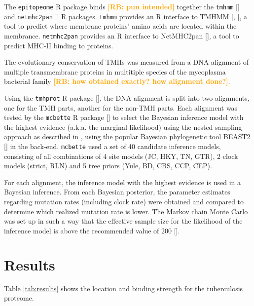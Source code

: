 \documentclass{article}
\newcommand{\richel}[1]{\textcolor{orange}{\textbf{[RB: #1]}}}
\begin{document}
The \verb;epitopeome; R package \cite{epitopeome} binds \richel{pun intended} 
together the \verb;tmhmm; [\cite{tmhmm}] and \verb;netmhc2pan; 
[\cite{netmhc2pan}] 
R packages. \verb;tmhmm; provides an R interface to
TMHMM [\cite{krogh2001predicting}, \cite{sonnhammer1998hidden}], a tool
to predict where membrane proteins' amino acids are located within the
membrance.   
\verb;netmhc2pan; provides an R interface to
NetMHC2pan [\cite{jensen2018improved}], a tool
to predict MHC-II binding to proteins.

The evolutionary conservation of TMHs was measured from a
DNA alignment of multiple transmembrane proteins in multitiple
species of the mycoplasma bacterial family
\richel{how obtained exactly? how alignment done?}.

Using the \verb;tmhprot; R package [\cite{tmhprot}], the DNA alignment is split
into two alignments, one for the TMH parts, another for the non-TMH
parts. Each alignment was tested by the \verb;mcbette; 
R package [\cite{mcbette}] to select the Bayesian inference model with
the highest evidence (a.k.a. the marginal likelihood) using the nested
sampling approach as described in \cite{maturana2018model},
using the popular Bayesian phylogenetic tool 
BEAST2 [\cite{bouckaert2014beast}] in the back-end.
\verb;mcbette; used a set of 40 candidate inference models, 
consisting of all combinations of 
4 site models (JC, HKY, TN, GTR), 
2 clock models (strict, RLN) and 
5 tree priors (Yule, BD, CBS, CCP, CEP).

For each alignment, the inference model with the highest evidence
is used in a Bayesian inference. From each Bayesian posterior,
the parameter estimates regarding mutation rates (including clock rate)
were obtained and compared to determine which realized mutation rate is lower.
The Markov chain Monte Carlo was set up in such a way that the effective sample
size for the likelihood of the inference model is above the recommended value
of 200 [\cite{bouckaert2014beast}].

\section{Results}

Table \ref{tab:results} shows the location and binding strength for the
tuberculosis proteome.
\end{document}
